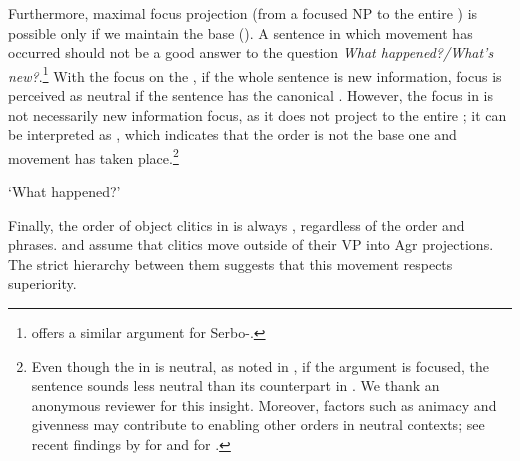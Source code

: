 \documentclass[output=paper,modfonts,newtxmath,hidelinks]{langscibook}
\begin{document}
\noindent Furthermore, maximal focus projection (from a focused NP to the entire ) is possible only if we maintain the base  (\citealt{hoehle82,vonstechowuhmann,haider92}). A sentence in which movement has occurred should not be a good answer to the question \textit{What happened?/What's new?}.\footnote{\citet[76]{stjepanovic-thesis} offers a similar argument for Serbo-.} With the focus on the , if the whole sentence is new information, focus is perceived as neutral if the sentence has the canonical  . However, the focus in  is not necessarily new information focus, as it does not project to the entire ; it can be interpreted as , which indicates that the order is not the base one and movement has taken place.\footnote{Even though the  in  is neutral, as noted in , if the \datt{} argument is focused, the sentence sounds less neutral than its counterpart in . We thank an anonymous reviewer for this insight. Moreover, factors such as animacy and givenness may contribute to enabling other orders in neutral contexts; see recent findings by  \citet{titov17} for  and \citet{velnic-diss} for .}    

\ea `What happened?'
\label{16:focusa}
\label{16:focusb}
\z \z


\noindent Finally, the order of object clitics in  is always \datt{} \before{} \accc, regardless of the order  and   phrases. \citet{stjepanovic-thesis} and \citet{Boskovic2001NatureSyntaxPhonology} assume that clitics move outside of their VP into Agr projections. The strict hierarchy between them suggests that this movement respects superiority.\largerpage[2]
	\ea
    \z \z
	
\end{document}
